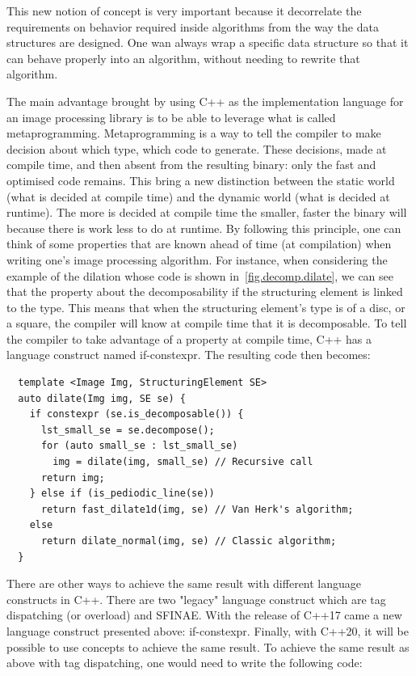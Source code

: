This new notion of concept is very important because it decorrelate the requirements on behavior required inside
algorithms from the way the data structures are designed. One wan always wrap a specific data structure so that it can
behave properly into an algorithm, without needing to rewrite that algorithm.


The main advantage brought by using C++ as the implementation language for an image processing library is to be able to
leverage what is called metaprogramming. Metaprogramming is a way to tell the compiler to make decision about which
type, which code to generate. These decisions, made at compile time, and then absent from the resulting binary: only the
fast and optimised code remains. This bring a new distinction between the static world (what is decided at compile time)
and the dynamic world (what is decided at runtime). The more is decided at compile time the smaller, faster the binary
will because there is work less to do at runtime. By following this principle, one can think of some properties that are
known ahead of time (at compilation) when writing one's image processing algorithm. For instance, when considering the
example of the dilation whose code is shown in~\ref{fig.decomp.dilate}, we can see that the property about the
decomposability if the structuring element is linked to the type. This means that when the structuring element's type is
of a disc, or a square, the compiler will know at compile time that it is decomposable. To tell the compiler to take
advantage of a property at compile time, C++ has a language construct named if-constexpr. The resulting code then
becomes:

\begin{verbatim}
  template <Image Img, StructuringElement SE>
  auto dilate(Img img, SE se) {
    if constexpr (se.is_decomposable()) {
      lst_small_se = se.decompose();
      for (auto small_se : lst_small_se)
        img = dilate(img, small_se) // Recursive call
      return img;
    } else if (is_pediodic_line(se))
      return fast_dilate1d(img, se) // Van Herk's algorithm;
    else
      return dilate_normal(img, se) // Classic algorithm;
  }
\end{verbatim}

There are other ways to achieve the same result with different language constructs in C++. There are two "legacy"
language construct which are tag dispatching (or overload) and SFINAE. With the release of C++17 came a new language
construct presented above: if-constexpr. Finally, with C++20, it will be possible to use concepts to achieve the same
result. To achieve the same result as above with tag dispatching, one would need to write the following code:

